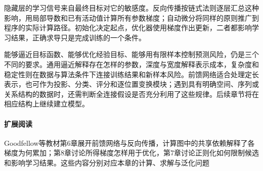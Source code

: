 隐藏层的学习信号来自最终目标对它的敏感度。反向传播按链式法则逐层汇总这种影响，用局部导数和已有活动值计算所有参数梯度；自动微分将同样的原则推广到程序的实际计算路径。初始化决定起点，优化器使用梯度作出更新，二者都影响学习结果，正确求导只是完成训练的一个条件。

能够逼近目标函数、能够优化经验目标、能够用有限样本控制预测风险，仍是三个不同的要求。通用逼近解释存在怎样的参数，深度与宽度解释表示成本，复杂度和稳定性则在数据与算法条件下连接训练结果和新样本风险。前馈网络适合处理定长表示，也可作为投影、分类、评分和逐位置变换模块；遇到具有明确空间、序列或关系结构的数据时，还需判断全连接假设是否充分利用了这些规律。后续章节将在相应结构上继续建立模型。

\paragraph{扩展阅读}
Goodfellow等教材第6章展开前馈网络与反向传播，计算图中的共享依赖解释了各梯度为何累加；第8章讨论所得梯度怎样用于优化，第7章讨论正则化如何限制候选和影响学习结果。这些内容分别对应本章的计算、求解与泛化问题
